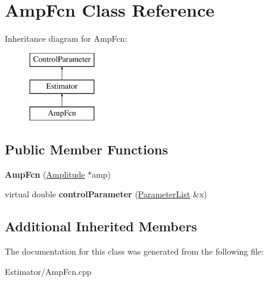 \hypertarget{class_amp_fcn}{\section{Amp\-Fcn Class Reference}
\label{class_amp_fcn}
}
Inheritance diagram for Amp\-Fcn\-:\begin{figure}[H]
\begin{center}
\leavevmode
\includegraphics[height=3.000000cm]{class_amp_fcn}
\end{center}
\end{figure}
\subsection*{Public Member Functions}
\begin{DoxyCompactItemize}
\item 
\hypertarget{class_amp_fcn_ac195a8261ff78dd0c9b526734ca94f62}{{\bfseries Amp\-Fcn} (\hyperlink{class_amplitude}{Amplitude} $\ast$amp)}\label{class_amp_fcn_ac195a8261ff78dd0c9b526734ca94f62}

\item 
\hypertarget{class_amp_fcn_a9bb2555dd3762ed399e12e3526d9b316}{virtual double {\bfseries control\-Parameter} (\hyperlink{class_parameter_list}{Parameter\-List} \&x)}\label{class_amp_fcn_a9bb2555dd3762ed399e12e3526d9b316}

\end{DoxyCompactItemize}
\subsection*{Additional Inherited Members}


The documentation for this class was generated from the following file\-:\begin{DoxyCompactItemize}
\item 
Estimator/Amp\-Fcn.\-cpp\end{DoxyCompactItemize}

